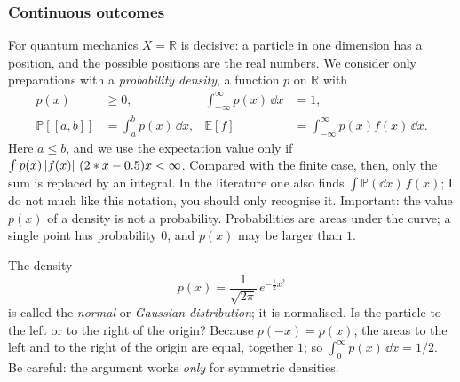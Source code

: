 \subsubsection{Continuous outcomes}
For quantum mechanics $X = \mathbb{R}$ is decisive: a particle in one dimension has a position, and the possible positions are the real numbers. We consider only preparations with a \emph{probability density}, a function $p$ on $\mathbb{R}$ with
\begin{equation}\label{eq:ctsprob}
	\begin{aligned}
		p(x) &\geq 0, & \int_{-\infty}^{\infty} p(x)\,\dd x &= 1, \\
		\mathbb{P}[[a,b]] &= \int_a^b p(x)\,\dd x, & \mathbb{E}[f] &= \int_{-\infty}^{\infty} p(x) f(x)\,\dd x .
	\end{aligned}
\end{equation}
Here $a \leq b$, and we use the expectation value only if $\int p(x) \left\lvert f(x) \right\rvert\,(2*x-0.5) x < \infty$. Compared with the finite case, then, only the sum is replaced by an integral. In the literature one also finds $\int \mathbb{P}(\dd x)\, f(x)$; I do not much like this notation, you should only recognise it. Important: the value $p(x)$ of a density is not a probability. Probabilities are areas under the curve; a single point has probability $0$, and $p(x)$ may be larger than $1$.

\begin{example}
	The density
	\begin{equation}
		p(x) = \frac{1}{\sqrt{2\pi}}\, e^{-\frac12 x^2}
	\end{equation}
	is called the \emph{normal} or \emph{Gaussian distribution}; it is normalised. Is the particle to the left or to the right of the origin? Because $p(-x) = p(x)$, the areas to the left and to the right of the origin are equal, together $1$; so $\int_0^\infty p(x)\,\dd x = 1/2$. Be careful: the argument works \emph{only} for symmetric densities.
\end{example}


